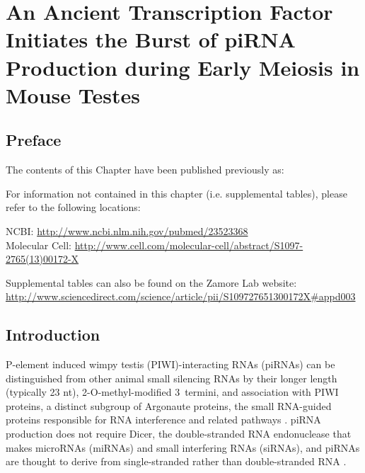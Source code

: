 \chapter{An Ancient Transcription Factor Initiates the Burst of piRNA Production during Early Meiosis in Mouse Testes} 
\label{MolCel} 
\section{Preface}
  \label{MolCel:sec:Preface}

  The contents of this Chapter have been published previously as:

  \begin{quote}
    \itshape 
    \singlespacing
    \end{quote}

  For information not contained in this chapter (i.e. supplemental tables), please refer to the following locations: 

  NCBI: \url{http://www.ncbi.nlm.nih.gov/pubmed/23523368} \\
  Molecular Cell: \url{http://www.cell.com/molecular-cell/abstract/S1097-2765(13)00172-X}

  Supplemental tables can also be found on the Zamore Lab website: \url{http://www.sciencedirect.com/science/article/pii/S109727651300172X#appd003}

\section{Introduction}
  \label{MolCel:sec:Introduction}

  P-element induced wimpy testis (PIWI)-interacting RNAs (piRNAs) can be distinguished from other animal small silencing RNAs by their longer length (typically 23 nt), 2\textprime-O-methyl-modified 3\textprime~termini, and association with PIWI proteins, a distinct subgroup of Argonaute proteins, the small RNA-guided proteins responsible for RNA interference and related pathways \citep{Kumar1998,Farazi2008,Kim2009,Thomson2009,Cenik2011,Aravin2008}. piRNA production does not require Dicer, the double-stranded RNA endonuclease that makes microRNAs (miRNAs) and small interfering RNAs (siRNAs), and piRNAs are thought to derive from single-stranded rather than double-stranded RNA \citep{Vagin2006, Houwing2007}.

